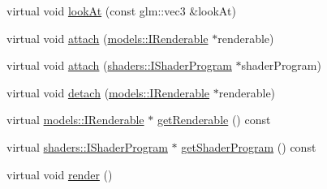 \begin{DoxyCompactItemize}
\item 
virtual void \hyperlink{classglr_1_1BasicSceneNode_ab8f6ec487b2d8740a660e6f5066c78db}{look\-At} (const glm\-::vec3 \&look\-At)
\item 
virtual void \hyperlink{classglr_1_1BasicSceneNode_a91b45e17416a614ed539d7c3db9d4e58}{attach} (\hyperlink{classglr_1_1models_1_1IRenderable}{models\-::\-I\-Renderable} $\ast$renderable)
\item 
virtual void \hyperlink{classglr_1_1BasicSceneNode_ac5e9f17c9ec9d8a7c66e39089875a909}{attach} (\hyperlink{classglr_1_1shaders_1_1IShaderProgram}{shaders\-::\-I\-Shader\-Program} $\ast$shader\-Program)
\item 
virtual void \hyperlink{classglr_1_1BasicSceneNode_aaa20e051494c1ae6a80980a7190c6db6}{detach} (\hyperlink{classglr_1_1models_1_1IRenderable}{models\-::\-I\-Renderable} $\ast$renderable)
\item 
virtual \hyperlink{classglr_1_1models_1_1IRenderable}{models\-::\-I\-Renderable} $\ast$ \hyperlink{classglr_1_1BasicSceneNode_a3f12bd5bb7547c330a69b39db4cfc319}{get\-Renderable} () const 
\item 
virtual \hyperlink{classglr_1_1shaders_1_1IShaderProgram}{shaders\-::\-I\-Shader\-Program} $\ast$ \hyperlink{classglr_1_1BasicSceneNode_a725ea33de7532a355d8cd438e2ab6daa}{get\-Shader\-Program} () const 
\item 
virtual void \hyperlink{classglr_1_1BasicSceneNode_a15dfdcd877d3c6eebc46ca5f9c0f284a}{render} ()
\end{DoxyCompactItemize}
